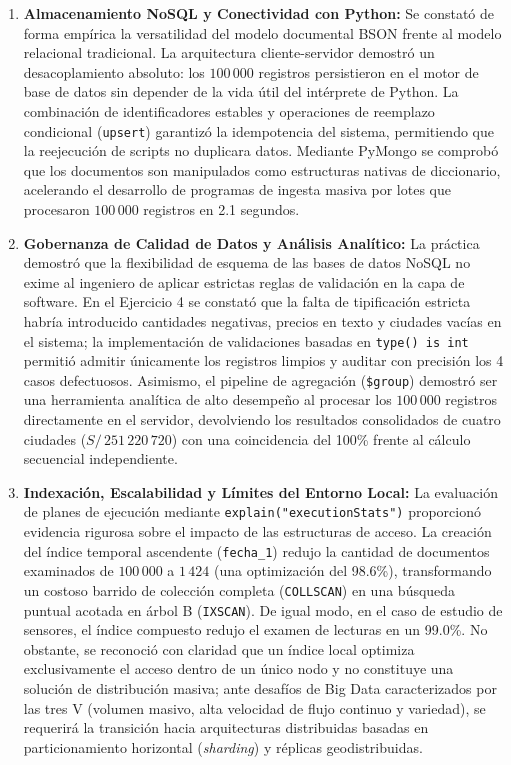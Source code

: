 \documentclass[12pt,a4paper]{article}
\begin{document}
\begin{enumerate}
    \item \textbf{Almacenamiento NoSQL y Conectividad con Python:} Se constató de forma empírica la versatilidad del modelo documental BSON frente al modelo relacional tradicional. La arquitectura cliente-servidor demostró un desacoplamiento absoluto: los $100\,000$ registros persistieron en el motor de base de datos sin depender de la vida útil del intérprete de Python. La combinación de identificadores estables y operaciones de reemplazo condicional (\texttt{upsert}) garantizó la idempotencia del sistema, permitiendo que la reejecución de scripts no duplicara datos. Mediante PyMongo se comprobó que los documentos son manipulados como estructuras nativas de diccionario, acelerando el desarrollo de programas de ingesta masiva por lotes que procesaron $100\,000$ registros en 2.1 segundos.
    
    \item \textbf{Gobernanza de Calidad de Datos y Análisis Analítico:} La práctica demostró que la flexibilidad de esquema de las bases de datos NoSQL no exime al ingeniero de aplicar estrictas reglas de validación en la capa de software. En el Ejercicio 4 se constató que la falta de tipificación estricta habría introducido cantidades negativas, precios en texto y ciudades vacías en el sistema; la implementación de validaciones basadas en \texttt{type() is int} permitió admitir únicamente los registros limpios y auditar con precisión los 4 casos defectuosos. Asimismo, el pipeline de agregación (\texttt{\$group}) demostró ser una herramienta analítica de alto desempeño al procesar los $100\,000$ registros directamente en el servidor, devolviendo los resultados consolidados de cuatro ciudades ($S/\,251\,220\,720$) con una coincidencia del 100\% frente al cálculo secuencial independiente.
    
    \item \textbf{Indexación, Escalabilidad y Límites del Entorno Local:} La evaluación de planes de ejecución mediante \texttt{explain("executionStats")} proporcionó evidencia rigurosa sobre el impacto de las estructuras de acceso. La creación del índice temporal ascendente (\texttt{fecha\_1}) redujo la cantidad de documentos examinados de $100\,000$ a $1\,424$ (una optimización del 98.6\%), transformando un costoso barrido de colección completa (\texttt{COLLSCAN}) en una búsqueda puntual acotada en árbol B (\texttt{IXSCAN}). De igual modo, en el caso de estudio de sensores, el índice compuesto redujo el examen de lecturas en un 99.0\%. No obstante, se reconoció con claridad que un índice local optimiza exclusivamente el acceso dentro de un único nodo y no constituye una solución de distribución masiva; ante desafíos de Big Data caracterizados por las tres V (volumen masivo, alta velocidad de flujo continuo y variedad), se requerirá la transición hacia arquitecturas distribuidas basadas en particionamiento horizontal (\textit{sharding}) y réplicas geodistribuidas.
\end{enumerate}
\end{document}
